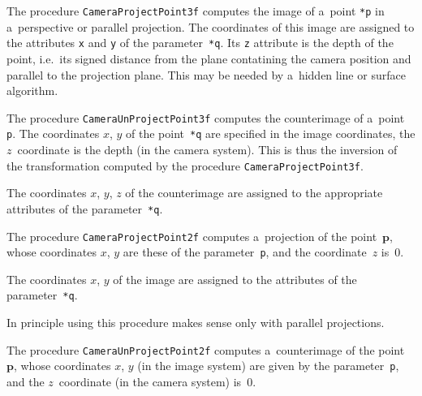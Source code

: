 \vspace{\bigskipamount}
The procedure \texttt{CameraProjectPoint3f} computes the image of a~point
\texttt{*p} in a~perspective or parallel projection. The coordinates of this
image are assigned to the attributes \texttt{x} and \texttt{y} of the
parameter~\texttt{*q}. Its \texttt{z} attribute is the depth of the point,
i.e.\ its signed distance from the plane contatining the camera position and
parallel to the projection plane. This may be needed by a~hidden line or
surface algorithm.

\vspace{\bigskipamount}
\begin{sloppypar}
The procedure \texttt{CameraUnProjectPoint3f} computes the counterimage
of a~point \texttt{p}. The coordinates $x$, $y$ of the point~\texttt{*q}
are specified in the image coordinates, the $z$~coordinate is the depth
(in the camera system). This is thus the inversion of the transformation
computed by the procedure \texttt{CameraProjectPoint3f}.%
\end{sloppypar}

The coordinates $x$, $y$, $z$ of the counterimage are assigned to the
appropriate attributes of the parameter~\texttt{*q}.

\vspace{\bigskipamount}
\begin{sloppypar}
The procedure \texttt{CameraProjectPoint2f} computes a~projection
of the point~$\bm{p}$, whose coordinates $x$, $y$ are these of the
parameter~\texttt{p}, and the coordinate~$z$ is~$0$.%
\end{sloppypar}

The coordinates $x$, $y$ of the image are assigned to the attributes of the
parameter~\texttt{*q}.

In principle using this procedure makes sense only with parallel
projections.

\vspace{\bigskipamount}
\begin{sloppypar}
The procedure \texttt{CameraUnProjectPoint2f} computes a~counterimage
of the point~$\bm{p}$, whose coordinates $x$, $y$ (in the image system) are
given by the parameter~\texttt{p}, and the $z$~coordinate (in the camera
system) is~$0$.%
\end{sloppypar}

